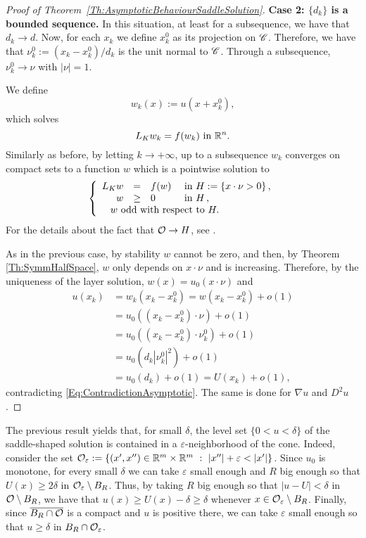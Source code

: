 \begin{proof}[Proof of Theorem~\ref{Th:AsymptoticBehaviourSaddleSolution}]
\textbf{Case 2: $\{d_k\}$ is a bounded sequence.}
In this situation, at least for a subsequence, we have that $d_k \rightarrow d$. Now, for each $x_k$ we define $x_k^0$ as its projection on $\mathscr{C}$. Therefore, we have that $ \nu_k^0 := (x_k-x_k^0)/d_k$ is the unit normal to $\mathscr{C}$. Through a subsequence, $ \nu_k^0 \rightarrow \nu$ with $|\nu|=1$.

We define
$$ w_k (x) := u(x+x_k^0), $$
which solves
$$ L_K  w_k = f(w_k) \ \text{in } \mathbb{R}^n. $$
Similarly as before, by letting $k\to +\infty$, up to a subsequence $w_k$ converges on compact sets to a function $w$ which is a pointwise solution to
$$
\beqc{\PDEsystem}
L_K  w &=& f(w)  &\textrm{ in } H:=\{x\cdot \nu >0\}\,,\\
w &\geq& 0  &\textrm{ in } H\,,\\
\,\,w \text{ odd with respect to } H. \span\span\span \,
\eeqc
$$
For the details about the fact that $\mathcal{O} \rightarrow H$, see \cite{CabreTerraI}.

As in the previous case, by stability $w$ cannot be zero, and then, by Theorem \ref{Th:SymmHalfSpace}, $w$ only depends on $x\cdot \nu$ and is increasing. Therefore, by the uniqueness of the layer solution, $w(x) = u_0(x\cdot \nu)$ and
\begin{align*}
u(x_k) &= w_k(x_k-x_k^0) = w(x_k-x_k^0) + o(1) \\
&= u_0((x_k-x_k^0)\cdot \nu) + o(1) \\
&= u_0((x_k-x_k^0)\cdot \nu_k^0) + o(1) \\
&= u_0(d_k |\nu_k^0|^2) + o(1) \\
&= u_0(d_k) + o(1) = U (x_k) + o(1),
\end{align*}
contradicting \eqref{Eq:ContradictionAsymptotic}. The same is done for $\nabla u$ and $D^2 u$.
\end{proof}

\begin{remark}
	\label{Remark:u>delta}
	The previous result yields that, for small $\delta$, the level set $\{0<u<\delta\}$ of the saddle-shaped solution is contained in a $\varepsilon$-neighborhood of the cone. Indeed, consider the set $\ocal_\varepsilon := \{(x',x'')\in \R^m\times\R^m \ : \ |x''|+\varepsilon <|x'| \}$. Since $u_0$ is monotone, for every small $\delta$ we can take $\varepsilon$ small enough and $R$ big enough so that $U(x)\geq 2\delta$ in $\mathcal{O}_\varepsilon \setminus B_R$. Thus, by taking $R$ big enough so that $|u-U|< \delta$ in $\mathcal{O} \setminus B_R$, we have that $u(x) \geq U(x)-\delta \geq \delta$ whenever $x\in \mathcal{O}_\varepsilon \setminus B_R$. Finally, since $\overline{B_R \cap \mathcal{O}}$ is a compact and $u$ is positive there, we can take $\varepsilon$ small enough so that $u\geq \delta$ in $B_R\cap \mathcal{O}_\varepsilon$.
\end{remark}